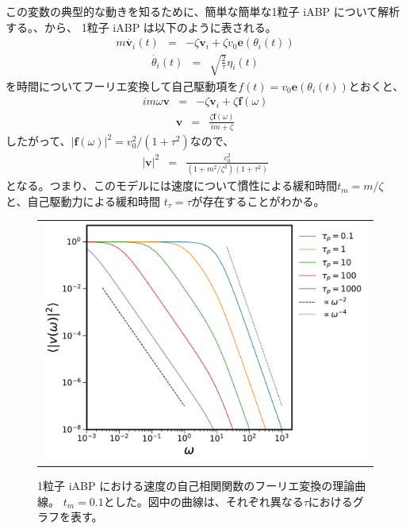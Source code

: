 \documentclass[/Users/ikedahajime/GitHub/reserch/master_report/thesis]{subfiles}
\begin{document}
この変数の典型的な動きを知るために、簡単な簡単な1粒子 iABP について解析する。、から、
1粒子 iABP は以下のように表される。
\begin{eqnarray}\label{eq:eom_iabp_single_1}
    m\dot{\bm{v}_i}(t)&=& - \zeta \bm{v}_i  +\zeta v_0 \bm{e}(\theta_i(t))
\end{eqnarray}
\begin{eqnarray}
    \dot{\theta_i }(t) &=& \sqrt{\frac{2}{\tau}}\eta_i(t)
\end{eqnarray}
を時間についてフーリエ変換して自己駆動項を$f(t)=v_0 \bm{e}(\theta_i(t))$とおくと、
\begin{eqnarray}
    im\omega\bm{v}&=&- \zeta \bm{v}_i  +\zeta \bm{f}(\omega)
\end{eqnarray}
\begin{eqnarray}
    \bm{v}&=&\frac{\zeta \bm{f}(\omega)}{im+\zeta}
\end{eqnarray}
したがって、$|\bm{f}(\omega)|^2=v_0^2/(1+\tau^2)$なので、
\begin{eqnarray}
    \left|\bm{v}\right|^2&=&\frac{v_0^2}{\left(1+m^2/\zeta^2\right)\left(1+\tau^2\right)}
\end{eqnarray}
となる。つまり、このモデルには速度について慣性による緩和時間$t_m=m/\zeta$と、自己駆動力による緩和時間
$t_\tau=\tau$が存在することがわかる。
\begin{figure}
    \centering
    \begin{tabular}{c}
        \begin{minipage}{0.7\hsize}
            \includegraphics[width=\textwidth]{img/method/ft_vcor.pdf}
        \end{minipage}
    \end{tabular}
    \caption[Four sample images]
    {
        1粒子 iABP における速度の自己相関関数のフーリエ変換の理論曲線。
        $t_{m}=0.1$とした。図中の曲線は、それぞれ異なる$\tau$におけるグラフを表す。
    }%
    \label{fig:sample_four_images}
\end{figure}
\end{document}
